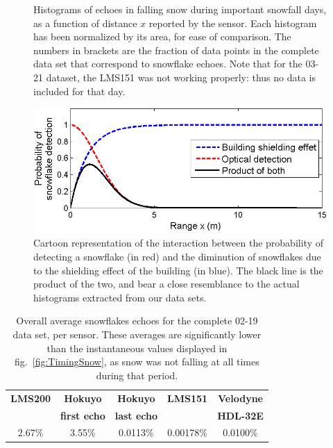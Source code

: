 \begin{figure}[th]
    \caption{Histograms of echoes in falling snow during important snowfall days, as a function of distance $x$ reported by the sensor. Each histogram has been normalized by its area, for ease of comparison. The numbers in brackets are the fraction of data points in the complete data set that correspond to snowflake echoes. Note that for the 03-21 dataset, the LMS151 was not working properly: thus no data is included for that day. }
    \label{fig:Histograms}
\end{figure}

\begin{figure}[th]
    \centering
    \includegraphics[width=0.97\linewidth]{./img/ShieldingModel.png}
    \caption{Cartoon representation of the interaction between the probability of detecting a snowflake (in red) and the diminution of snowflakes due to the shielding effect of the building (in blue). The black line is the product of the two, and bear a close resemblance to the actual histograms extracted from our data sets. }
    \label{fig:CartoonModel}
\end{figure}


\begin{table}[htbp]
    \centering
    \begin{tabular}{|c|c|c|c|c|}
        \hline
        \textbf{LMS200}       & \textbf{Hokuyo}             & \textbf{Hokuyo}    & \textbf{LMS151}  & \textbf{Velodyne}  \\
                                        & \textbf{first echo}   & \textbf{last echo}  &                            & \textbf{HDL-32E}  \\\hline
                 2.67\%            &           3.55\%                &       0.0113\%      &       0.00178\%     &  0.0100\%  \\\hline
    \end{tabular}
    \caption{Overall average snowflakes echoes for the complete 02-19 data set, per sensor. These averages are significantly lower than the instantaneous values displayed in fig.~\ref{fig:TimingSnow}, as snow was not falling at all times during that period.}
    \label{tab:avgRates}
\end{table}



